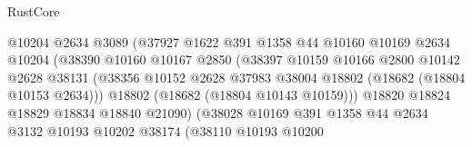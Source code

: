 \begin{lexlean}{RustCore}
\begin{coremodule}
                                        @10204
                                        @2634
                                        @3089
                                        (@37927
                                          @1622
                                          @391
                                          @1358
                                          @44
                                          @10160
                                          @10169
                                          @2634
                                          @10204
                                          (@38390
                                            @10160
                                            @10167
                                            @2850
                                            (@38397
                                              @10159
                                              @10166
                                              @2800
                                              @10142
                                              @2628
                                              @38131
                                              (@38356
                                                @10152
                                                @2628
                                                @37983
                                                @38004
                                                @18802
                                                (@18682 (@18804 @10153 @2634)))
                                              @18802
                                              (@18682 (@18804 @10143 @10159)))
                                            @18820
                                            @18824
                                            @18829
                                            @18834
                                            @18840
                                            @21090)
                                          (@38028
                                            @10169
                                            @391
                                            @1358
                                            @44
                                            @2634
                                            @3132
                                            @10193
                                            @10202
                                            @38174
                                            (@38110
                                              @10193
                                              @10200

\end{coremodule}
\end{lexlean}
